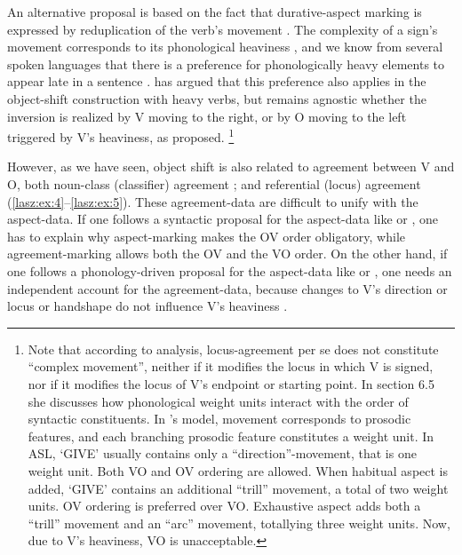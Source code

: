 \documentclass[output=paper]{langscibook}
\begin{document}
An alternative proposal is based on the fact that durative-aspect
marking is expressed by reduplication of the verb’s movement 
\citep{Klima.Bellugi.1979}. The complexity of a sign’s movement corresponds to
its phonological heaviness \citep{Brentari.1998}, and we know from several
spoken languages that there is a preference for phonologically heavy
elements to appear late in a sentence .
\citet{Brentari.1998} has argued that this preference also applies in the
object-shift construction with heavy verbs, but remains agnostic
whether the inversion is realized by V moving to the right, or by O
moving to the left triggered by V’s heaviness, as \citet{Liddell.1980}
proposed.%
\footnote{%
    Note that according to  analysis, locus-agreement per se
    does not constitute “complex movement”, neither if it modifies the locus in which V
    is signed, nor if it modifies the locus of V’s endpoint or starting point. In section 6.5
    she discusses how phonological weight units interact with the order of syntactic
    constituents. In \citeauthor{Brentari.1998}’s model, movement corresponds to prosodic features, and
    each branching prosodic feature constitutes a weight unit. In ASL, `GIVE' usually
    contains only a “direction”-movement, that is one weight unit. Both VO and OV
    ordering are allowed. When habitual aspect is added, `GIVE' contains an additional
    “trill” movement, a total of two weight units. OV ordering is preferred over VO.
    Exhaustive aspect adds both a “trill” movement and an “arc” movement, totallying
    three weight units. Now, due to V’s heaviness, VO is unacceptable.
}

However, as we have seen, object shift is also related to
agreement between V and O, both noun-class (classifier) agreement
; and referential (locus) agreement (\ref{lasz:ex:4}--\ref{lasz:ex:5}). 
These agreement-data
are difficult to unify with the aspect-data. If one follows a syntactic
proposal for the aspect-data like \citet{Matsuoka.1997} or \citet{Braze.2004},
one has to explain why aspect-marking makes the OV order
obligatory, while agreement-marking allows both the OV and the VO
order. On the other hand, if one follows a phonology-driven proposal
for the aspect-data like \citet{Liddell.1980} or \citet{Brentari.1998}, one needs an
independent account for the agreement-data, because changes to V’s
direction or locus or handshape do not influence V’s heaviness
\citep{Brentari.1998}.
\end{document}

